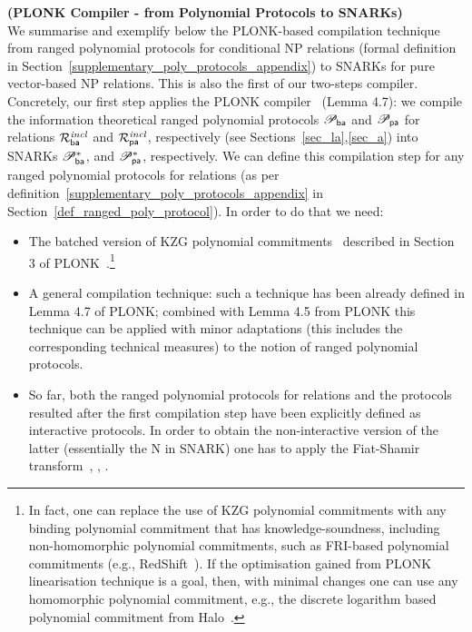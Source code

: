\noindent \textbf{(PLONK Compiler - from Polynomial Protocols to SNARKs)} \\

\noindent We summarise and exemplify below the PLONK-based compilation technique~\cite{plonk} from 
ranged polynomial protocols for conditional NP relations (formal definition in Section~\ref{supplementary_poly_protocols_appendix}) to 
SNARKs for pure vector-based NP relations. This is also the first of our two-steps compiler. Concretely, our first step applies the PLONK compiler~\cite{plonk} (Lemma 4.7): 
we compile the information theoretical ranged polynomial protocols $\mathscr{P}_{\mathsf{ba}}$ and $\mathscr{P}_{\mathsf{pa}}$ for relations $\mathcal{R}^{\mathit{incl}}_{\mathsf{ba}}$ and $\mathcal{R}^{\mathit{incl}}_{\mathsf{pa}}$, respectively (see Sections~\ref{sec_la},\ref{sec_a}) 
into SNARKs $\mathscr{P}_{\mathsf{ba}}^{\ast}$, and $\mathscr{P}_{\mathsf{pa}}^{\ast}$, respectively. We can define this compilation step for any ranged polynomial protocols for relations 
(as per definition~\ref{supplementary_poly_protocols_appendix} in Section~\ref{def_ranged_poly_protocol}). In order to do that we need: 
\begin{itemize}
\item  The batched version of KZG polynomial commitments~\cite{KZG_10} described in Section 3 of PLONK~\cite{plonk}.\footnote{In fact, 
one can replace the use of KZG polynomial commitments with any binding polynomial commitment that has knowledge-soundness, including non-homomorphic polynomial commitments, 
such as FRI-based polynomial commitments (e.g., RedShift~\cite{redshift}). If the optimisation gained from PLONK linearisation technique is a goal, 
then, with minimal changes one can use any homomorphic polynomial commitment, e.g., the discrete logarithm based polynomial commitment 
from Halo~\cite{halo}.}
\item A general compilation technique: such a technique has been already defined in Lemma 4.7 of PLONK; combined with Lemma 4.5 
from PLONK this technique can be applied with minor adaptations (this includes the corresponding technical measures) to the notion of ranged 
polynomial protocols.  
\item So far, both the ranged polynomial protocols for relations and the protocols resulted after the first compilation step have been explicitly defined as interactive 
protocols. In order to obtain the non-interactive version of the latter (essentially the N in SNARK) one has to apply the Fiat-Shamir 
transform~\cite{FS_transform}, \cite{FS_transform_with_proof}, \cite{SE_plonk}.
\end{itemize}

